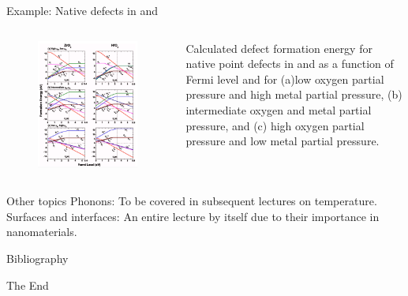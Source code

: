 \documentclass[aspectratio=169]{beamer}
\begin{document}
\begin{frame}{Example: Native defects in  and }

\begin{columns}
\begin{figure}
    \centering
    \includegraphics[width=0.7\linewidth]{lectures/figures/8_Defect_Diagram_ZrO2_HfO2.png}
\end{figure} 
Calculated defect formation energy for native point defects in  and  as a function of Fermi level and for (a)low oxygen partial pressure and high metal partial pressure, (b) intermediate oxygen and metal partial pressure, and (c) high oxygen partial pressure and low metal partial pressure.\cite{zhengFirstprinciplesStudyNative2007}
\end{columns} 

\end{frame} 

\begin{frame}{Other topics}
Phonons: To be covered in subsequent lectures on temperature.\newline
\newline
Surfaces and interfaces: An entire lecture by itself due to their importance in nanomaterials.


\end{frame} 

    \begin{frame}[allowframebreaks]{Bibliography}
        
        
    \end{frame}



    \begin{frame}
        \Huge{\centerline{The End}}
    \end{frame}
\end{document}
